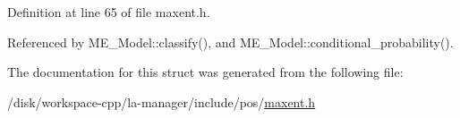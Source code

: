 Definition at line 65 of file maxent.h.

Referenced by ME\_\-Model::classify(), and ME\_\-Model::conditional\_\-probability().

The documentation for this struct was generated from the following file:\begin{CompactItemize}
\item 
/disk/workspace-cpp/la-manager/include/pos/\hyperlink{maxent_8h}{maxent.h}\end{CompactItemize}
